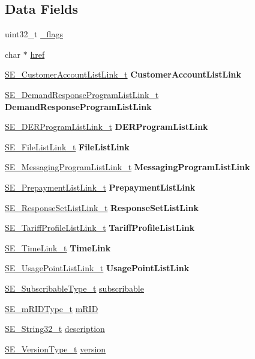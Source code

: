 \subsection*{Data Fields}
\begin{DoxyCompactItemize}
\item 
uint32\+\_\+t \hyperlink{group__FunctionSetAssignments_ga43199a4b6deab506dfea455cbd110bb1}{\+\_\+flags}
\item 
char $\ast$ \hyperlink{group__FunctionSetAssignments_ga46858e8380281930bb14b6366e53b409}{href}
\item 
\hyperlink{structSE__CustomerAccountListLink__t}{S\+E\+\_\+\+Customer\+Account\+List\+Link\+\_\+t} {\bfseries Customer\+Account\+List\+Link}
\item 
\hyperlink{structSE__DemandResponseProgramListLink__t}{S\+E\+\_\+\+Demand\+Response\+Program\+List\+Link\+\_\+t} {\bfseries Demand\+Response\+Program\+List\+Link}
\item 
\hyperlink{structSE__DERProgramListLink__t}{S\+E\+\_\+\+D\+E\+R\+Program\+List\+Link\+\_\+t} {\bfseries D\+E\+R\+Program\+List\+Link}
\item 
\hyperlink{structSE__FileListLink__t}{S\+E\+\_\+\+File\+List\+Link\+\_\+t} {\bfseries File\+List\+Link}
\item 
\hyperlink{structSE__MessagingProgramListLink__t}{S\+E\+\_\+\+Messaging\+Program\+List\+Link\+\_\+t} {\bfseries Messaging\+Program\+List\+Link}
\item 
\hyperlink{structSE__PrepaymentListLink__t}{S\+E\+\_\+\+Prepayment\+List\+Link\+\_\+t} {\bfseries Prepayment\+List\+Link}
\item 
\hyperlink{structSE__ResponseSetListLink__t}{S\+E\+\_\+\+Response\+Set\+List\+Link\+\_\+t} {\bfseries Response\+Set\+List\+Link}
\item 
\hyperlink{structSE__TariffProfileListLink__t}{S\+E\+\_\+\+Tariff\+Profile\+List\+Link\+\_\+t} {\bfseries Tariff\+Profile\+List\+Link}
\item 
\hyperlink{structSE__TimeLink__t}{S\+E\+\_\+\+Time\+Link\+\_\+t} {\bfseries Time\+Link}
\item 
\hyperlink{structSE__UsagePointListLink__t}{S\+E\+\_\+\+Usage\+Point\+List\+Link\+\_\+t} {\bfseries Usage\+Point\+List\+Link}
\item 
\hyperlink{group__SubscribableType_ga5c41f553d369710ed34619266bf2551e}{S\+E\+\_\+\+Subscribable\+Type\+\_\+t} \hyperlink{group__FunctionSetAssignments_ga08bccfbdb77b5bbf15fd21112db0f922}{subscribable}
\item 
\hyperlink{group__mRIDType_gac74622112f3a388a2851b2289963ba5e}{S\+E\+\_\+m\+R\+I\+D\+Type\+\_\+t} \hyperlink{group__FunctionSetAssignments_gaa16faad1f8ce02dc776c45a3df312b9a}{m\+R\+ID}
\item 
\hyperlink{group__String32_gac9f59b06b168b4d2e0d45ed41699af42}{S\+E\+\_\+\+String32\+\_\+t} \hyperlink{group__FunctionSetAssignments_ga93b00fabe30a35c1cbd436181e3c7d50}{description}
\item 
\hyperlink{group__VersionType_ga4b8d27838226948397ed99f67d46e2ae}{S\+E\+\_\+\+Version\+Type\+\_\+t} \hyperlink{group__FunctionSetAssignments_ga3d328d9c7ceed42375352905628206b8}{version}
\end{DoxyCompactItemize}


